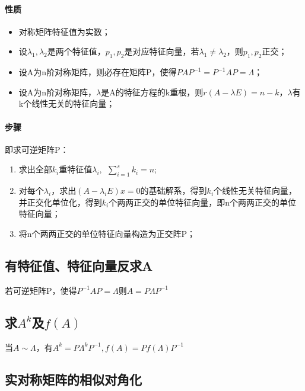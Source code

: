 \paragraph{性质}
\begin{itemize}
    \item 对称矩阵特征值为实数；
    \item 设\(\lambda_1, \lambda_2\)是两个特征值，\(p_1, p_2\)是对应特征向量，若\(\lambda_1 \neq \lambda_2\)，则\(p_1,p_2\)正交；
    \item 设A为n阶对称矩阵，则必存在矩阵P，使得\(PAP^{-1} = P^{-1}AP = \Lambda\)；
    \item 设A为n阶对称矩阵，\(\lambda\)是A的特征方程的k重根，则\(r(A - \lambda E) = n - k\)，\(\lambda\)有k个线性无关的特征向量；
\end{itemize}


\paragraph{步骤}
即求可逆矩阵P：
\begin{enumerate}
    \item 求出全部\(k_i\)重特征值\(\lambda_i,\ \ \displaystyle\sum_{i = 1}^s k_i = n\);
    \item 对每个\(\lambda_i\)，求出\((A - \lambda_iE)x = 0\)的基础解系，得到\(k_i\)个线性无关特征向量，并正交化单位化，得到\(k_i\)个两两正交的单位特征向量，即n个两两正交的单位特征向量；
    \item 将n个两两正交的单位特征向量构造为正交阵P；
\end{enumerate}

\subsection{有特征值、特征向量反求A}
若可逆矩阵P，使得\(P^{-1}AP = \Lambda\)则\(A = P\Lambda P^{-1}\)

\subsection{求\(A^k\)及\(f(A)\)}
当\(A \sim \Lambda\)，有\(A^k = P\Lambda^kP^{-1}, f(A) = Pf(\Lambda)P^{-1}\)


\subsection{实对称矩阵的相似对角化}

